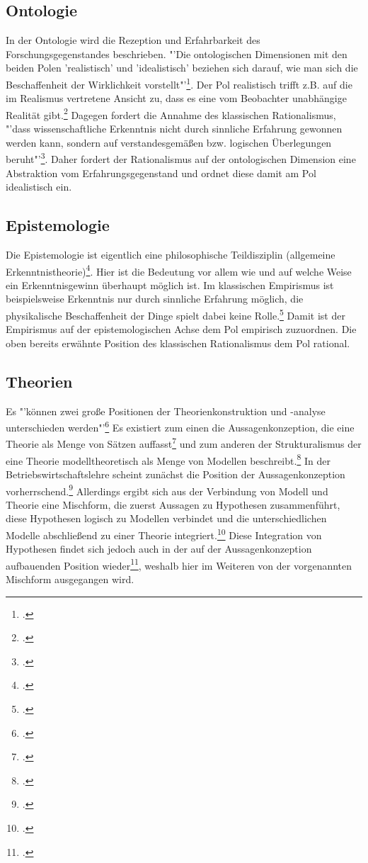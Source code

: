 \documentclass[a4paper,12pt]{article}
\begin{document}
\subsection{Ontologie}
In der Ontologie wird die Rezeption und Erfahrbarkeit des Forschungsgegenstandes beschrieben. "'Die ontologischen Dimensionen mit den beiden Polen 'realistisch' und 'idealistisch' beziehen sich darauf, wie man sich die Beschaffenheit  der Wirklichkeit vorstellt"'\footcite[S. 94]{Helfrich2024}. Der Pol realistisch trifft z.B. auf die im Realismus vertretene Ansicht zu, dass es eine vom Beobachter unabhängige Realität gibt.\footcite[S. 95]{Helfrich2024} Dagegen fordert die Annahme des klassischen Rationalismus, "'dass wissenschaftliche Erkenntnis nicht durch sinnliche Erfahrung gewonnen werden kann, sondern auf verstandesgemäßen bzw. logischen Überlegungen beruht"'\footcite[S. 100]{Helfrich2024}. Daher fordert der Rationalismus auf der ontologischen Dimension eine Abstraktion vom Erfahrungsgegenstand und ordnet diese damit am Pol idealistisch ein.
\subsection{Epistemologie}
Die Epistemologie ist eigentlich eine philosophische Teildisziplin (allgemeine Erkenntnistheorie)\footcite[S. 1]{Helfrich2024}. Hier ist die Bedeutung vor allem wie und auf welche Weise ein Erkenntnisgewinn überhaupt möglich ist. Im klassischen Empirismus ist beispielsweise Erkenntnis nur durch sinnliche Erfahrung möglich, die physikalische Beschaffenheit der Dinge spielt dabei keine Rolle.\footcite[S. 98]{Helfrich2024} Damit ist der Empirismus auf der epistemologischen Achse dem Pol empirisch zuzuordnen. Die oben bereits erwähnte Position des klassischen Rationalismus dem Pol rational.
\subsection{Theorien}
Es "'können zwei große Positionen der Theorienkonstruktion und -analyse unterschieden werden"'\footcite[S. 100]{Kornmesser2020} Es existiert zum einen die Aussagenkonzeption, die eine Theorie als Menge von Sätzen auffasst\footcite[S. 100]{Kornmesser2020} und zum anderen der Strukturalismus der eine Theorie modelltheoretisch als Menge von Modellen beschreibt.\footcite[S. 100]{Kornmesser2020} In der Betriebswirtschaftslehre scheint zunächst die Position der Aussagenkonzeption vorherrschend.\footcite[S. 61]{Helfrich2024} Allerdings ergibt sich aus der Verbindung von Modell und Theorie eine Mischform, die zuerst Aussagen zu Hypothesen zusammenführt, diese Hypothesen logisch zu Modellen verbindet und die unterschiedlichen Modelle abschließend zu einer Theorie integriert.\footcite[S. 84]{Kornmeier2007} Diese Integration von Hypothesen findet sich jedoch auch in der auf der Aussagenkonzeption aufbauenden Position wieder\footcite[S. 63]{Helfrich2024}, weshalb hier im Weiteren von der vorgenannten Mischform ausgegangen wird.
\end{document}
